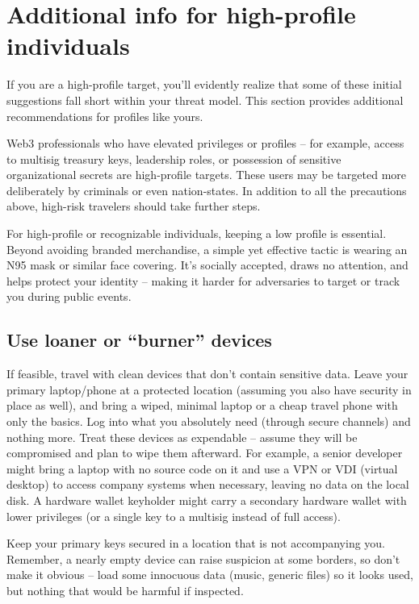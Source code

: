 \chapter{Additional info for high-profile individuals}
\label{ch:high-profile}

If you are a high-profile target, you'll evidently realize
that some of these initial suggestions fall short within
your threat model. This section provides additional
recommendations for profiles like yours.

Web3 professionals who have elevated privileges or
profiles -- for example, access to multisig treasury keys,
leadership roles, or possession of sensitive
organizational secrets are high-profile targets. These
users may be targeted more deliberately by criminals or
even nation-states. In addition to all the precautions
above, high-risk travelers should take further steps.

For high-profile or recognizable individuals, keeping a
low profile is essential. Beyond avoiding branded
merchandise, a simple yet effective tactic is wearing an
N95 mask or similar face covering. It's socially accepted,
draws no attention, and helps protect your identity --
making it harder for adversaries to target or track you
during public events.

\section{Use loaner or ``burner'' devices}

If feasible, travel with clean devices that don't contain
sensitive data. Leave your primary laptop/phone at a
protected location (assuming you also have security in
place as well), and bring a wiped, minimal laptop or a
cheap travel phone with only the basics. Log into what you
absolutely need (through secure channels) and nothing
more. Treat these devices as expendable -- assume they
will be compromised and plan to wipe them afterward. For
example, a senior developer might bring a laptop with no
source code on it and use a VPN or VDI (virtual desktop)
to access company systems when necessary, leaving no data
on the local disk. A hardware wallet keyholder might carry
a secondary hardware wallet with lower privileges (or a
single key to a multisig instead of full access).

Keep your primary keys secured in a location that is not
accompanying you. Remember, a nearly empty device can
raise suspicion at some borders, so don't make it obvious
-- load some innocuous data (music, generic files) so it
looks used, but nothing that would be harmful if
inspected.

